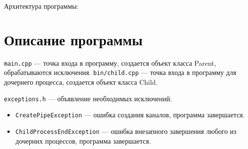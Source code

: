 Архитектура программы:



\section{Описание программы}

\texttt{main.cpp} --- точка входа в программу, создается объект класса Parent, обрабатываются исключения.
\texttt{bin/child.cpp} --- точка входа в программу для дочернего процесса, создается объект класса Child.

\texttt{exceptions.h} --- объявление необходимых исключений.
\begin{itemize}
\item \texttt{CreatePipeException} --- ошибка создания каналов, программа завершается.
\item \texttt{ChildProcessEndException} --- ошибка внезапного завершения любого из дочерних процессов, программа завершается.
\end{itemize}

